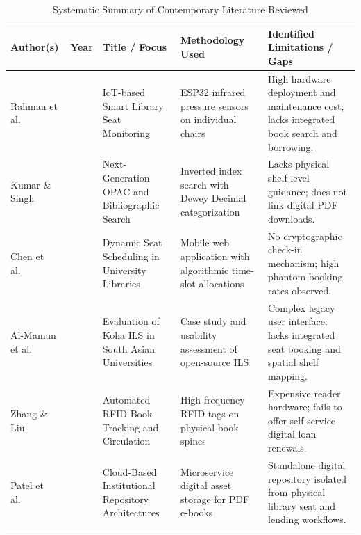 \begin{table}[H]
\centering
\caption{Systematic Summary of Contemporary Literature Reviewed}
\label{tab:lit_review_summary}
\small
\begin{tabularx}{\textwidth}{>{\raggedright\arraybackslash}p{2.6cm} >{\centering\arraybackslash}p{1.0cm} >{\raggedright\arraybackslash}p{3.2cm} >{\raggedright\arraybackslash}X >{\raggedright\arraybackslash}X}
\toprule
\textbf{Author(s)} & \textbf{Year} & \textbf{Title / Focus} & \textbf{Methodology Used} & \textbf{Identified Limitations / Gaps} \\
\midrule
Rahman et al.~\cite{rahman2022smart} & 2022 & IoT-based Smart Library Seat Monitoring & ESP32 infrared pressure sensors on individual chairs & High hardware deployment and maintenance cost; lacks integrated book search and borrowing. \\
Kumar \& Singh~\cite{kumar2023opac} & 2023 & Next-Generation OPAC and Bibliographic Search & Inverted index search with Dewey Decimal categorization & Lacks physical shelf level guidance; does not link digital PDF downloads. \\
Chen et al.~\cite{chen2021reservation} & 2021 & Dynamic Seat Scheduling in University Libraries & Mobile web application with algorithmic time-slot allocations & No cryptographic check-in mechanism; high phantom booking rates observed. \\
Al-Mamun et al.~\cite{almamun2024koha} & 2024 & Evaluation of Koha ILS in South Asian Universities & Case study and usability assessment of open-source ILS & Complex legacy user interface; lacks integrated seat booking and spatial shelf mapping. \\
Zhang \& Liu~\cite{zhang2023rfid} & 2023 & Automated RFID Book Tracking and Circulation & High-frequency RFID tags on physical book spines & Expensive reader hardware; fails to offer self-service digital loan renewals. \\
Patel et al.~\cite{patel2024digital} & 2024 & Cloud-Based Institutional Repository Architectures & Microservice digital asset storage for PDF e-books & Standalone digital repository isolated from physical library seat and lending workflows. \\
\bottomrule
\end{tabularx}
\end{table}

